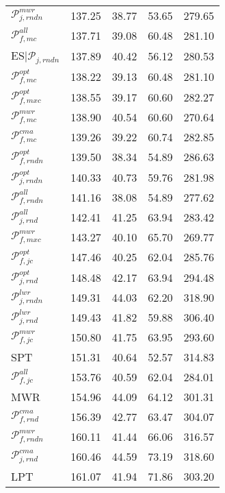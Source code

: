 \begin{tabular}{|@{}l@{}|@{}r@{}|@{}r@{}|@{}r@{}|@{}r@{}|}
${\mathcal{P}_{j,rndn}^{mwr}}$ &  137.25 &  38.77 &  53.65 &  279.65  \\ 
${\mathcal{P}_{f,mc}^{all}}$ &  137.71 &  39.08 &  60.48 &  281.10  \\ 
ES$|{\mathcal{P}_{j,rndn}}$ &  137.89 &  40.42 &  56.12 &  280.53  \\ 
${\mathcal{P}_{f,mc}^{opt}}$ &  138.22 &  39.13 &  60.48 &  281.10  \\ 
${\mathcal{P}_{f,mxc}^{opt}}$ &  138.55 &  39.17 &  60.60 &  282.27  \\ 
${\mathcal{P}_{f,mc}^{mwr}}$ &  138.90 &  40.54 &  60.60 &  270.64  \\ 
${\mathcal{P}_{f,mc}^{cma}}$ &  139.26 &  39.22 &  60.74 &  282.85  \\ 
${\mathcal{P}_{f,rndn}^{opt}}$ &  139.50 &  38.34 &  54.89 &  286.63  \\ 
${\mathcal{P}_{j,rndn}^{opt}}$ &  140.33 &  40.73 &  59.76 &  281.98  \\ 
${\mathcal{P}_{f,rndn}^{all}}$ &  141.16 &  38.08 &  54.89 &  277.62  \\ 
${\mathcal{P}_{j,rnd}^{all}}$ &  142.41 &  41.25 &  63.94 &  283.42  \\ 
${\mathcal{P}_{f,mxc}^{mwr}}$ &  143.27 &  40.10 &  65.70 &  269.77  \\ 
${\mathcal{P}_{f,jc}^{opt}}$ &  147.46 &  40.25 &  62.04 &  285.76  \\ 
${\mathcal{P}_{j,rnd}^{opt}}$ &  148.48 &  42.17 &  63.94 &  294.48  \\ 
${\mathcal{P}_{j,rndn}^{lwr}}$ &  149.31 &  44.03 &  62.20 &  318.90  \\ 
${\mathcal{P}_{j,rnd}^{lwr}}$ &  149.43 &  41.82 &  59.88 &  306.40  \\ 
${\mathcal{P}_{f,jc}^{mwr}}$ &  150.80 &  41.75 &  63.95 &  293.60  \\ 
SPT &  151.31 &  40.64 &  52.57 &  314.83  \\ 
${\mathcal{P}_{f,jc}^{all}}$ &  153.76 &  40.59 &  62.04 &  284.01  \\ 
MWR &  154.96 &  44.09 &  64.12 &  301.31  \\ 
\boldmath${\mathcal{P}_{f,rnd}^{cma}}$ &  156.39 &  42.77 &  63.47 &  304.07  \\ 
${\mathcal{P}_{f,rndn}^{mwr}}$ &  160.11 &  41.44 &  66.06 &  316.57  \\ 
${\mathcal{P}_{j,rnd}^{cma}}$ &  160.46 &  44.59 &  73.19 &  318.60  \\ 
LPT &  161.07 &  41.94 &  71.86 &  303.20  \\ \hline
\end{tabular}
